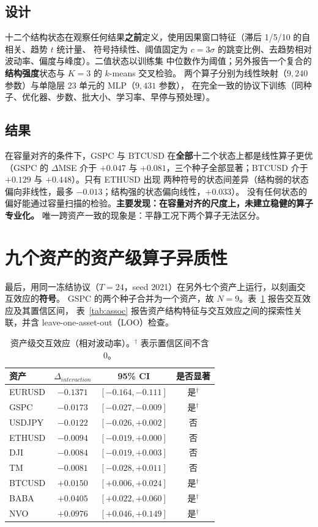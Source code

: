 \documentclass[preprint,12pt]{elsarticle}
\begin{document}
\subsection{设计}
十二个结构状态在观察任何结果\textbf{之前}定义，使用因果窗口特征（滞后 1/5/10 的自相关、趋势 $t$ 统计量、
符号持续性、阈值固定为 $c=3\sigma$ 的跳变比例、去趋势相对波动率、偏度与峰度）。二值状态以训练集
中位数作为阈值；另外报告一个复合的\textbf{结构强度}状态与 $K{=}3$ 的 $k$-means 交叉检验。
两个算子分别为线性映射（$9{,}240$ 参数）与单隐层 23 单元的 MLP（$9{,}431$ 参数），
在完全一致的协议下训练（同种子、优化器、步数、批大小、学习率、早停与预处理）。

\subsection{结果}
在容量对齐的条件下，GSPC 与 BTCUSD 在\textbf{全部}十二个状态上都是线性算子更优（GSPC 的 $\Delta$MSE
介于 $+0.047$ 与 $+0.081$，三个种子全部显著；BTCUSD 介于 $+0.129$ 与 $+0.448$）。只有 ETHUSD 出现
两种符号的状态间差异（结构弱的状态偏向非线性，最多 $-0.013$；结构强的状态偏向线性，$+0.033$）。
没有任何状态的偏好能通过容量扫描的检验。\textbf{主要发现：在容量对齐的尺度上，未建立稳健的算子专业化。}
唯一跨资产一致的现象是：平静工况下两个算子无法区分。

\section{九个资产的资产级算子异质性}
\label{sec:assets}

最后，用同一冻结协议（$T=24$，seed 2021）在另外七个资产上运行，以刻画交互效应的\textbf{符号}。
GSPC 的两个种子合并为一个资产，故 $N=9$。表~\ref{tab:assets} 报告交互效应及其置信区间，
表~\ref{tab:assoc} 报告资产结构特征与交互效应之间的探索性关联，并含 leave-one-asset-out（LOO）检查。

\begin{table}[!t]
\centering
\small
\caption{资产级交互效应（相对波动率）。$^\dagger$ 表示置信区间不含 0。}
\label{tab:assets}
\begin{tabular}{@{}lccc@{}}
\toprule
资产 & $\Delta_{interaction}$ & 95\% CI & 是否显著 \\
\midrule
EURUSD & $-0.1371$ & $[-0.164,-0.111]$ & 是$^\dagger$ \\
GSPC   & $-0.0173$ & $[-0.027,-0.009]$ & 是$^\dagger$ \\
USDJPY & $-0.0122$ & $[-0.026,+0.002]$ & 否 \\
ETHUSD & $-0.0094$ & $[-0.019,+0.000]$ & 否 \\
DJI    & $-0.0084$ & $[-0.019,+0.003]$ & 否 \\
TM     & $-0.0081$ & $[-0.028,+0.011]$ & 否 \\
BTCUSD & $+0.0150$ & $[+0.006,+0.024]$ & 是$^\dagger$ \\
BABA   & $+0.0405$ & $[+0.022,+0.060]$ & 是$^\dagger$ \\
NVO    & $+0.0976$ & $[+0.046,+0.149]$ & 是$^\dagger$ \\
\bottomrule
\end{tabular}
\end{table}
\end{document}
